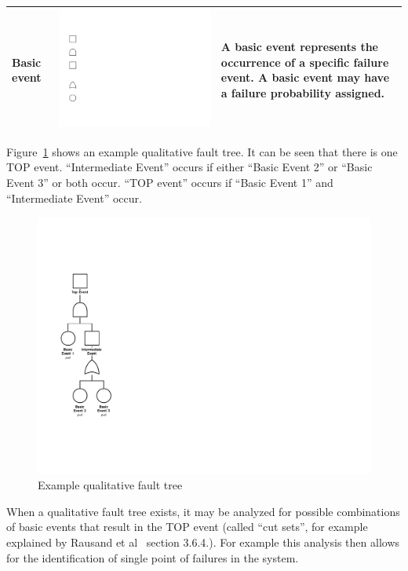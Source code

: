 \begin{table}[!h]
\begin{tabularx}{\linewidth}{ |l|m{1.35cm}|X| }
    Basic event & \includegraphics[keepaspectratio=true,scale=0.8] {images/fault-tree-basic-event.pdf} & A basic event represents the occurrence of a specific failure event. A basic event may have a failure probability assigned.\\
    \hline
  \end{tabularx}
\end{table}

Figure~\ref{fig:fault-tree-example-qualitative} shows an example qualitative fault tree. It can be seen that there is one TOP event. ``Intermediate Event'' occurs if either ``Basic Event 2'' or ``Basic Event 3'' or both occur. ``TOP event'' occurs if ``Basic Event 1'' and ``Intermediate Event'' occur.

\begin{figure}[!h]
  \centering
  \includegraphics[width=0.25\columnwidth] {images/fault-tree-example-qualitative.pdf}
  \caption{Example qualitative fault tree}
  \label{fig:fault-tree-example-qualitative}
\end{figure}

When a qualitative fault tree exists, it may be analyzed for possible combinations of basic events that result in the TOP event (called ``cut sets'', for example explained by Rausand et al~\cite{SysReliabilityTheory} section 3.6.4.). For example this analysis then allows for the identification of single point of failures in the system.

